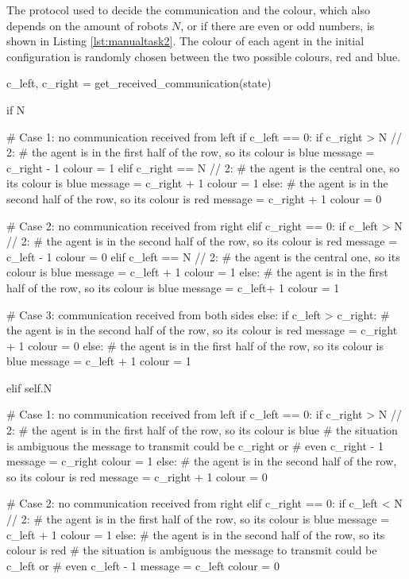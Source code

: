 The protocol used to decide the communication and the colour, which also 
depends on the amount of robots $N$, or if there are even or odd numbers, is 
shown in Listing \ref{lst:manualtask2}. The colour of each agent in the initial 
configuration is randomly chosen between the two possible colours, red and blue.

\begin{python}
c_left, c_right = get_received_communication(state)

if N %

	# Case 1: no communication received from left
	if c_left == 0:
		if c_right > N // 2:
			# the agent is in the first half of the row, so its colour is blue
			message = c_right - 1
			colour = 1
		elif c_right == N // 2:
			# the agent is the central one, so its colour is blue
			message = c_right + 1
			colour = 1
		else:
			# the agent is in the second half of the row, so its colour is red
			message = c_right + 1
			colour = 0
			
	# Case 2: no communication received from right
	elif c_right == 0:
		if c_left > N // 2:
			# the agent is in the second half of the row, so its colour is red
			message = c_left - 1
			colour = 0
		elif c_left == N // 2:
			# the agent is the central one, so its colour is blue
			message = c_left + 1
			colour = 1
		else:
			# the agent is in the first half of the row, so its colour is blue
			message = c_left+ 1
			colour = 1
			
	# Case 3: communication received from both sides
	else:
		if c_left > c_right:
			# the agent is in the second half of the row, so its colour is red
			message = c_right + 1
			colour = 0
		else:
			# the agent is in the first half of the row, so its colour is blue
			message = c_left + 1
			colour = 1


elif self.N %

	# Case 1: no communication received from left
	if c_left == 0:
		if c_right > N // 2:
			# the agent is in the first half of the row, so its colour is blue
			# the situation is ambiguous the message to transmit could be c_right or 
			# even c_right - 1
			message = c_right
			colour = 1
		else:
			# the agent is in the second half of the row, so its colour is red
			message = c_right + 1
			colour = 0
	
	# Case 2: no communication received from right
	elif c_right == 0:
		if c_left < N // 2:
			# the agent is in the first half of the row, so its colour is blue
			message = c_left + 1
			colour = 1
		else:
			# the agent is in the second half of the row, so its colour is red
			# the situation is ambiguous the message to transmit could be c_left or 
			# even c_left - 1
			message = c_left
			colour = 0
	

\end{python}
